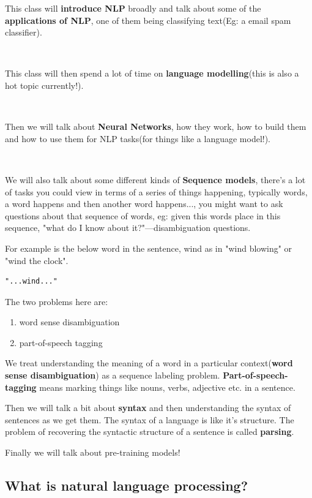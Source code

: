 \documentclass[11pt]{article}
\begin{document}
This class will \textbf{introduce NLP} broadly and talk about some of the \textbf{applications of NLP}, one of them being classifying text(Eg: a email spam classifier). 

\

This class will then spend a lot of time on \textbf{language modelling}(this is also a hot topic currently!). 

\

Then we will talk about \textbf{Neural Networks}, how they work, how to build them and how to use them for NLP tasks(for things like a language model!).

\

We will also talk about some different kinds of \textbf{Sequence models}, there's a lot of tasks you could view in terms of a series of things happening, typically words, a word happens and then another word happens..., you might want to ask questions about that sequence of words, eg: given this words place in this sequence, "what do I know about it?"---disambiguation questions.


For example is the below word in the sentence, wind as in "wind blowing" or "wind the clock".
\begin{center}
\begin{BVerbatim}
"...wind..."
\end{BVerbatim}
\end{center}


The two problems here are:
\begin{enumerate}
  \item word sense disambiguation
  \item part-of-speech tagging  
\end{enumerate}

We treat understanding the meaning of a word in a particular context(\textbf{word sense disambiguation}) as a sequence labeling problem. \textbf{Part-of-speech-tagging} means marking things like nouns, verbs, adjective etc. in a sentence.


Then we will talk a bit about \textbf{syntax} and then understanding the syntax of sentences as we get them. The syntax of a language is like it's structure. The problem of recovering the syntactic structure of a sentence is called \textbf{parsing}.


Finally we will talk about pre-training models!

\subsection*{What is natural language processing?}
\end{document}
